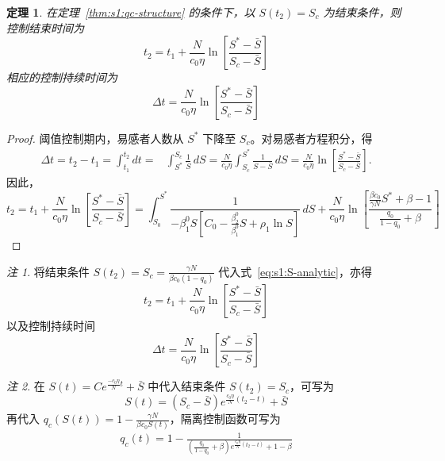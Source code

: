 \documentclass[UTF8,a4paper,10pt,fontset=fandol]{ctexart}
\theoremstyle{cnplain}
\newtheorem{theorem}{定理}[section]
\theoremstyle{remark}
\newtheorem*{remark}{注}
\numberwithin{equation}{section}
\begin{document}
\begin{theorem}
    在定理~\ref{thm:s1:qc-structure} 的条件下，以 $S(t_2)=S_c$ 为结束条件，则控制结束时间为
    \begin{equation}
    t_2
    =
    t_1+
    \frac{N}{c_0 \eta}
    \ln \left[
    \frac{S^*-\bar S}
    {S_c-\bar S}
    \right]
    \label{eq:s1:t2}
    \end{equation}
    相应的控制持续时间为
        \begin{equation}
        \Delta t = \frac{N}{c_0 \eta}
        \ln \left[
        \frac{S^*-\bar S}
        {S_c-\bar S}
        \right]
    \end{equation}
\end{theorem}
\begin{proof}   
    阈值控制期内，易感者人数从 $S^*$ 下降至 $S_c$。对易感者方程积分，得
    \begin{align*}
        \Delta t=t_2-t_1=\int_{t_1}^{t_2} dt=&\int_{S^*}^{S_c} \frac{1}{\dot{S}} \, dS
        =\frac{N}{c_0\eta}\int_{S_c}^{S^*} \frac{1}{S-\bar S}\,dS
        =\frac{N}{c_0 \eta}
        \ln \left[
        \frac{S^*-\bar S}
        {S_c-\bar S}
        \right].
    \end{align*}
    因此，
    \begin{equation*}
    t_2
    =
    t_1+
    \frac{N}{c_0 \eta}
    \ln \left[
    \frac{S^*-\bar S}
    {S_c-\bar S}
    \right]=\int_{S_0}^{S^*}
    \frac{1}{
    -\beta_1^0S\left[
    C_0-\frac{\beta_2^0}{\beta_1^0}S+\rho_1\ln S
    \right]
    }\,dS + \frac{N}{c_0 \eta}
    \ln \left[
    \frac{\frac{\beta c_0}{\gamma N}S^*+ \beta-1}
    {\frac{q_0}{1-q_0}+ \beta}
    \right]
    \end{equation*}
\end{proof}

\begin{remark}
    将结束条件 $S(t_2)=S_c=\frac{\gamma N}{\beta c_0(1-q_0)}$ 代入式~\eqref{eq:s1:S-analytic}，亦得
    \begin{equation*}
     t_2= t_1+\frac{N}{c_0 \eta}
     \ln \left[
     \frac{S^*-\bar S}
     {S_c-\bar S}
     \right]
    \end{equation*}
    以及控制持续时间
    \begin{equation*}
    \Delta t = \frac{N}{c_0 \eta}
     \ln \left[
     \frac{S^*-\bar S}
     {S_c-\bar S}
     \right]
    \end{equation*}
\end{remark}
\begin{remark}
    在 $S(t)=C e^{\frac{-c_0 \eta}{N}t}+\bar S$ 中代入结束条件 $S(t_2)=S_c$，可写为
    \begin{equation*}
    S(t) = \left( S_c - \bar S \right) e^{\frac{c_0\eta}{N}(t_2 - t )} + \bar S
    \end{equation*}
    再代入 $q_c(S(t))=1-\frac{\gamma N}{\beta c_0S(t)}$，隔离控制函数可写为
    \begin{align*}
    q_c(t)=1 - \frac{1}{(\tfrac{q_0}{1-q_0}+\beta)e^{\frac{c_0\eta}{N}(t_2 - t )}+1-\beta}
    \end{align*}
\end{remark}
\end{document}
